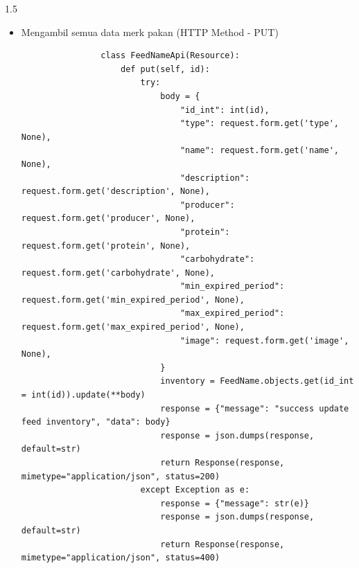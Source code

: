 \begin{spacing}{1.5}
\begin{enumerate}
\begin{itemize}
			\begin{lstlisting}
				class FeedNamesApi(Resource):
					@jwt_required()
					def post(self):
						try:
							current_user = get_jwt_identity()
							farm = str(current_user['farm_id'])
							body = {
								"farm_id": farm,
								"type": request.form.get('type', None),
								"name": request.form.get('name', None),
								"description": request.form.get('description', None),
								"producer": request.form.get('producer', None),
								"protein": request.form.get('protein', None),
								"carbohydrate": request.form.get('carbohydrate', None),
								"min_expired_period": request.form.get('min_expired_period', None),
								"max_expired_period": request.form.get('max_expired_period', None),
								"image": request.form.get('image', None),
							}
							feed_name = FeedName(**body).save()
							id = feed_name.id
							res = {"message": "success add feed name to db", "id": id, "data": body}
							response = json.dumps(res, default=str)
							return Response(response, mimetype="application/json", status=200)
						except Exception as e:
							response = {"message": str(e)}
							response = json.dumps(response, default=str)
							return Response(response, mimetype="application/json", status=400)
			\end{lstlisting}

			\item Mengambil semua data merk pakan (HTTP Method - PUT)
			
			\begin{lstlisting}
				class FeedNameApi(Resource):
					def put(self, id):
						try:
							body = {
								"id_int": int(id),
								"type": request.form.get('type', None),
								"name": request.form.get('name', None),
								"description": request.form.get('description', None),
								"producer": request.form.get('producer', None),
								"protein": request.form.get('protein', None),
								"carbohydrate": request.form.get('carbohydrate', None),
								"min_expired_period": request.form.get('min_expired_period', None),
								"max_expired_period": request.form.get('max_expired_period', None),
								"image": request.form.get('image', None),
							}
							inventory = FeedName.objects.get(id_int = int(id)).update(**body)
							response = {"message": "success update feed inventory", "data": body}
							response = json.dumps(response, default=str)
							return Response(response, mimetype="application/json", status=200)
						except Exception as e:
							response = {"message": str(e)}
							response = json.dumps(response, default=str)
							return Response(response, mimetype="application/json", status=400)
			\end{lstlisting}


\end{itemize}
\end{enumerate}
\end{spacing}
